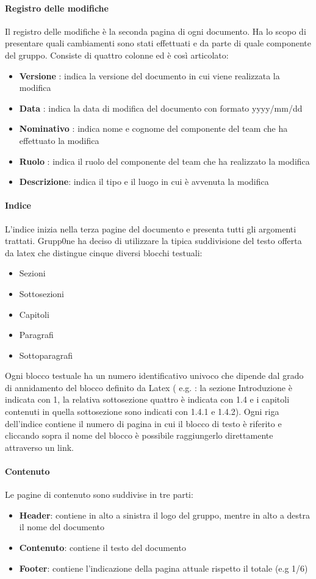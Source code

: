 \documentclass[../norme-di-progetto.tex]{subfiles}
\begin{document}
\paragraph{Registro delle modifiche}
Il registro delle modifiche è la seconda pagina di ogni documento. Ha lo scopo di presentare quali cambiamenti sono stati effettuati e da parte di quale componente del gruppo. Consiste di quattro colonne ed è così articolato:
\begin{itemize}
	\item \textbf{Versione} : indica la versione del documento in cui viene realizzata la modifica
	\item \textbf{Data} : indica la data di modifica del documento con formato yyyy/mm/dd
	\item \textbf{Nominativo} : indica nome e cognome del componente del team che ha effettuato la modifica
	\item \textbf{Ruolo} : indica il ruolo del componente del team che ha realizzato la modifica
	\item \textbf{Descrizione}: indica il tipo e il luogo in cui è avvenuta la modifica
\end{itemize}
\paragraph{Indice}
L'indice inizia nella terza pagine del documento e presenta tutti gli argomenti trattati. Grupp0ne ha deciso di utilizzare la tipica suddivisione del testo offerta da latex che distingue cinque diversi blocchi testuali:
\begin{itemize}
	\item Sezioni
	\item Sottosezioni
	\item Capitoli
	\item Paragrafi
	\item Sottoparagrafi 
\end{itemize}
Ogni blocco testuale ha un numero identificativo univoco che dipende dal grado di annidamento del blocco definito da Latex ( e.g. : la sezione Introduzione è indicata con 1, la relativa sottosezione quattro è indicata con 1.4 e i capitoli contenuti in quella sottosezione sono indicati con 1.4.1 e 1.4.2).
\newline Ogni riga dell'indice contiene il numero di pagina in cui il blocco di testo è riferito e cliccando sopra il nome del blocco è possibile raggiungerlo direttamente attraverso un link.
\paragraph{Contenuto}
Le pagine di contenuto sono suddivise in tre parti:
\begin{itemize}
	\item \textbf{Header}: contiene in alto a sinistra il logo del gruppo, mentre in alto a destra il nome del documento
	\item \textbf{Contenuto}: contiene il testo del documento
	\item \textbf{Footer}: contiene l'indicazione della pagina attuale rispetto il totale (e.g 1/6)
\end{itemize}
\end{document}
